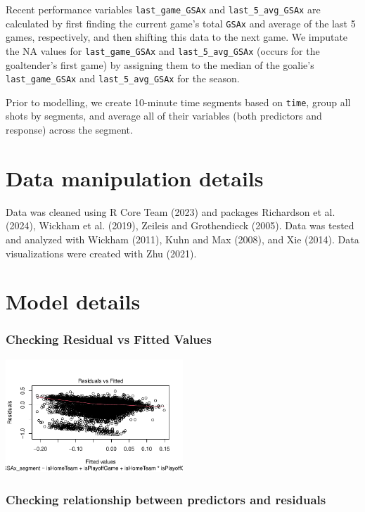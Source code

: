 \documentclass[
  letterpaper,
  DIV=11,
  numbers=noendperiod]{scrartcl}
\begin{document}
Recent performance variables \texttt{last\_game\_GSAx} and
\texttt{last\_5\_avg\_GSAx} are calculated by first finding the current
game's total \texttt{GSAx} and average of the last 5 games,
respectively, and then shifting this data to the next game. We imputate
the NA values for \texttt{last\_game\_GSAx} and
\texttt{last\_5\_avg\_GSAx} (occurs for the goaltender's first game) by
assigning them to the median of the goalie's \texttt{last\_game\_GSAx}
and \texttt{last\_5\_avg\_GSAx} for the season.

Prior to modelling, we create 10-minute time segments based on
\texttt{time}, group all shots by segments, and average all of their
variables (both predictors and response) across the segment.

\section{Data manipulation details}\label{data-manipulation-details}

Data was cleaned using R Core Team (2023) and packages Richardson et al.
(2024), Wickham et al. (2019), Zeileis and Grothendieck (2005). Data was
tested and analyzed with Wickham (2011), Kuhn and Max (2008), and Xie
(2014). Data visualizations were created with Zhu (2021).

\section{Model details}\label{sec-model-details}

\subsubsection{Checking Residual vs Fitted
Values}\label{checking-residual-vs-fitted-values}

\includegraphics[width=0.5\textwidth,height=\textheight]{paper_files/figure-pdf/unnamed-chunk-27-1.pdf}

\subsubsection{Checking relationship between predictors and
residuals}\label{checking-relationship-between-predictors-and-residuals}
\end{document}
